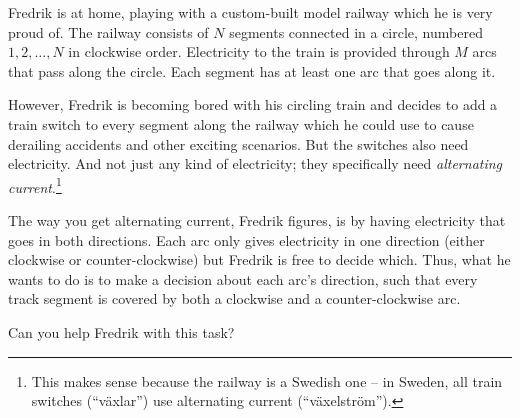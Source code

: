 \ifx\boi\undefined\fi
\def\version{jury-draft}
Fredrik is at home, playing with a custom-built model railway which he is very proud of.
The railway consists of $N$ segments connected in a circle, numbered $1, 2, \dots, N$ in clockwise order.
Electricity to the train is provided through $M$ arcs that pass along the
circle. Each segment has at least one arc that goes along it.

However, Fredrik is becoming bored with his circling train and decides to add a train switch to every segment along the railway which he could use to cause derailing accidents and other exciting scenarios. But the switches also need electricity.
And not just any kind of electricity; they specifically need \emph{alternating current}.\footnote{This makes sense because the railway is a Swedish one -- in Sweden, all train switches (``växlar'') use alternating current (``växelström'').}




The way you get alternating current, Fredrik figures, is by having electricity
that goes in both directions. Each arc only gives electricity in one direction
(either clockwise or counter-clockwise) but Fredrik is free to decide which.
Thus, what he wants to do is to make a decision about each arc's direction,
such that every track segment is covered by both a clockwise and a
counter-clockwise arc.

Can you help Fredrik with this task?

